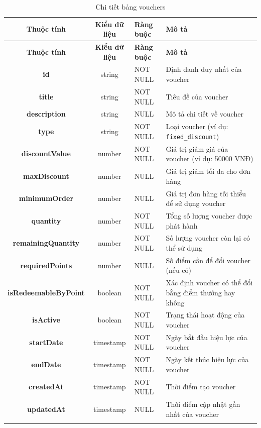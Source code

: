 \documentclass[../DoAn.tex]{subfiles}
\begin{document}
\begin{longtable}{|c|c|l|p{6cm}|}
\hline
\textbf{Thuộc tính} & \textbf{Kiểu dữ liệu} & \textbf{Ràng buộc} & \textbf{Mô tả} \\
\hline
\endfirsthead

\hline
\textbf{Thuộc tính} & \textbf{Kiểu dữ liệu} & \textbf{Ràng buộc} & \textbf{Mô tả} \\
\hline
\endhead

\hline
\endfoot

\hline
\endlastfoot

\textbf{id} & string & NOT NULL & Định danh duy nhất của voucher \\
\hline
\textbf{title} & string & NOT NULL & Tiêu đề của voucher \\
\hline
\textbf{description} & string & NULL & Mô tả chi tiết về voucher \\
\hline
\textbf{type} & string & NOT NULL & Loại voucher (ví dụ: \texttt{fixed\_discount}) \\
\hline
\textbf{discountValue} & number & NOT NULL & Giá trị giảm giá của voucher (ví dụ: 50000 VNĐ) \\
\hline
\textbf{maxDiscount} & number & NULL & Giá trị giảm tối đa cho đơn hàng \\
\hline
\textbf{minimumOrder} & number & NULL & Giá trị đơn hàng tối thiểu để sử dụng voucher \\
\hline
\textbf{quantity} & number & NOT NULL & Tổng số lượng voucher được phát hành \\
\hline
\textbf{remainingQuantity} & number & NOT NULL & Số lượng voucher còn lại có thể sử dụng \\
\hline
\textbf{requiredPoints} & number & NULL & Số điểm cần để đổi voucher (nếu có) \\
\hline
\textbf{isRedeemableByPoint} & boolean & NOT NULL & Xác định voucher có thể đổi bằng điểm thưởng hay không \\
\hline
\textbf{isActive} & boolean & NOT NULL & Trạng thái hoạt động của voucher \\
\hline
\textbf{startDate} & timestamp & NOT NULL & Ngày bắt đầu hiệu lực của voucher \\
\hline
\textbf{endDate} & timestamp & NOT NULL & Ngày kết thúc hiệu lực của voucher \\
\hline
\textbf{createdAt} & timestamp & NOT NULL & Thời điểm tạo voucher \\
\hline
\textbf{updatedAt} & timestamp & NULL & Thời điểm cập nhật gần nhất của voucher \\
\hline

\caption{Chi tiết bảng vouchers}
\label{tab:vouchersTable}
\end{longtable}
\end{document}
